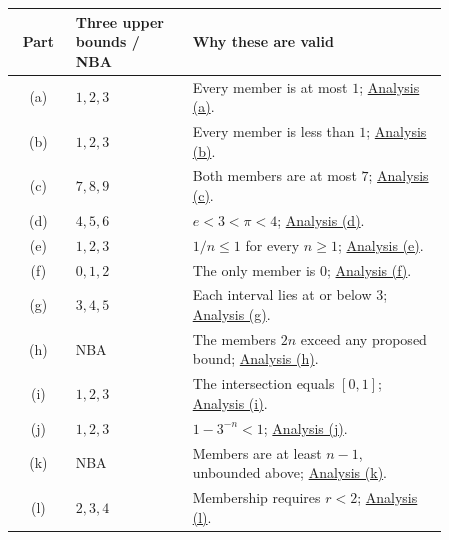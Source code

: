 \begin{center}
\begin{tabular}{@{}c@{\quad}p{0.27\linewidth}@{\quad}p{0.59\linewidth}@{}}
\toprule
Part&Three upper bounds / NBA&Why these are valid\\ \midrule
(a)&$1,2,3$&Every member is at most $1$; \hyperref[bounds:a]{Analysis (a)}.\\
(b)&$1,2,3$&Every member is less than $1$; \hyperref[bounds:b]{Analysis (b)}.\\
(c)&$7,8,9$&Both members are at most $7$; \hyperref[bounds:c]{Analysis (c)}.\\
(d)&$4,5,6$&$e<3<\pi<4$; \hyperref[bounds:d]{Analysis (d)}.\\
(e)&$1,2,3$&$1/n\leq1$ for every $n\geq1$; \hyperref[bounds:e]{Analysis (e)}.\\
(f)&$0,1,2$&The only member is $0$; \hyperref[bounds:f]{Analysis (f)}.\\
(g)&$3,4,5$&Each interval lies at or below $3$; \hyperref[bounds:g]{Analysis (g)}.\\
(h)&NBA&The members $2n$ exceed any proposed bound; \hyperref[bounds:h]{Analysis (h)}.\\
(i)&$1,2,3$&The intersection equals $[0,1]$; \hyperref[bounds:i]{Analysis (i)}.\\
(j)&$1,2,3$&$1-3^{-n}<1$; \hyperref[bounds:j]{Analysis (j)}.\\
(k)&NBA&Members are at least $n-1$, unbounded above; \hyperref[bounds:k]{Analysis (k)}.\\
(l)&$2,3,4$&Membership requires $r<2$; \hyperref[bounds:l]{Analysis (l)}.\\
\bottomrule
\end{tabular}
\end{center}

